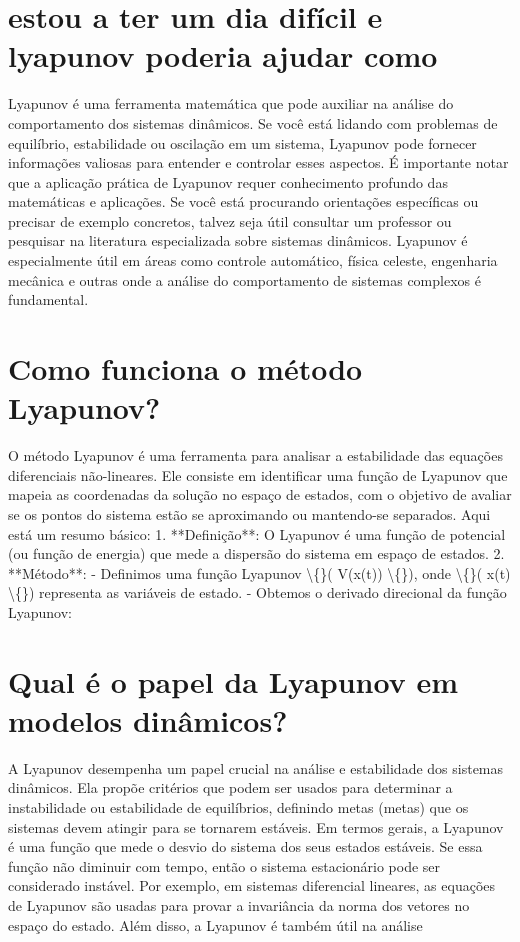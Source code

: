 \documentclass[11pt,a4paper]{article}
\begin{document}
\section{estou a ter um dia difícil e lyapunov poderia ajudar como}
Lyapunov é uma ferramenta matemática que pode auxiliar na análise do comportamento dos sistemas dinâmicos. Se você está lidando com problemas de equilíbrio, estabilidade ou oscilação em um sistema, Lyapunov pode fornecer informações valiosas para entender e controlar esses aspectos. É importante notar que a aplicação prática de Lyapunov requer conhecimento profundo das matemáticas e aplicações. Se você está procurando orientações específicas ou precisar de exemplo concretos, talvez seja útil consultar um professor ou pesquisar na literatura especializada sobre sistemas dinâmicos. Lyapunov é especialmente útil em áreas como controle automático, física celeste, engenharia mecânica e outras onde a análise do comportamento de sistemas complexos é fundamental.

\section{Como funciona o método Lyapunov?}
O método Lyapunov é uma ferramenta para analisar a estabilidade das equações diferenciais não-lineares. Ele consiste em identificar uma função de Lyapunov que mapeia as coordenadas da solução no espaço de estados, com o objetivo de avaliar se os pontos do sistema estão se aproximando ou mantendo-se separados. Aqui está um resumo básico: 1. **Definição**: O Lyapunov é uma função de potencial (ou função de energia) que mede a dispersão do sistema em espaço de estados. 2. **Método**: - Definimos uma função Lyapunov \textbackslash\{\}( V(x(t)) \textbackslash\{\}), onde \textbackslash\{\}( x(t) \textbackslash\{\}) representa as variáveis de estado. - Obtemos o derivado direcional da função Lyapunov:

\section{Qual é o papel da Lyapunov em modelos dinâmicos?}
A Lyapunov desempenha um papel crucial na análise e estabilidade dos sistemas dinâmicos. Ela propõe critérios que podem ser usados para determinar a instabilidade ou estabilidade de equilíbrios, definindo metas (metas) que os sistemas devem atingir para se tornarem estáveis. Em termos gerais, a Lyapunov é uma função que mede o desvio do sistema dos seus estados estáveis. Se essa função não diminuir com tempo, então o sistema estacionário pode ser considerado instável. Por exemplo, em sistemas diferencial lineares, as equações de Lyapunov são usadas para provar a invariância da norma dos vetores no espaço do estado. Além disso, a Lyapunov é também útil na análise
\end{document}

